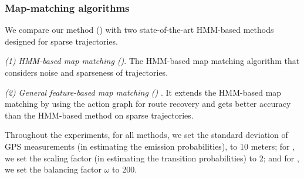 


\subsubsection{Map-matching algorithms}
We compare our method (\stmm) with two state-of-the-art HMM-based methods designed for sparse trajectories.

\ni \emph{(1) HMM-based map matching (\hmmbased)}\cite{Newson2009Hidden}.
The HMM-based map matching algorithm that considers noise and sparseness of trajectories.

\ni \emph{(2) General feature-based map matching (\gfbased)}\cite{yin:feature-based} .
It extends the HMM-based map matching by using the action graph for route
recovery and gets better accuracy than the HMM-based method on sparse trajectories.


Throughout the experiments, for all methods, we set the standard deviation of GPS measurements (in estimating the emission probabilities),
to 10 meters; for \hmmbased, we set the scaling factor (in estimating the transition probabilities) to 2; and for \gfbased, we set
the balancing factor $\omega$ to 200.

